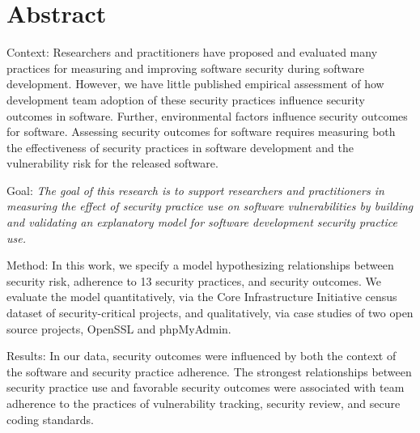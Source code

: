 \section{Abstract}
\label{sec:abstract}
Context: Researchers and practitioners have proposed and evaluated many practices for measuring and improving software security during software development. However, we have little published empirical assessment of how development team adoption of these security practices influence security outcomes in software. Further, environmental factors influence security outcomes for software. Assessing security outcomes for software requires measuring both the effectiveness of security practices in software development and the vulnerability risk for the released software.

Goal:  \textit{The goal of this research is to support researchers and practitioners in measuring the effect of security practice use on software vulnerabilities by building and validating an explanatory model for software development security practice use.} 

Method: In this work, we specify a model hypothesizing relationships between security risk, adherence to 13 security practices, and security outcomes.  We evaluate the model quantitatively, via the Core Infrastructure Initiative census dataset of security-critical projects, and qualitatively, via case studies of two open source projects, OpenSSL and phpMyAdmin. 

Results: In our data, security outcomes were influenced by both the context of the software and security practice adherence. The strongest relationships between security practice use and favorable security outcomes were associated with team adherence to the practices of vulnerability tracking, security review, and secure coding standards. 